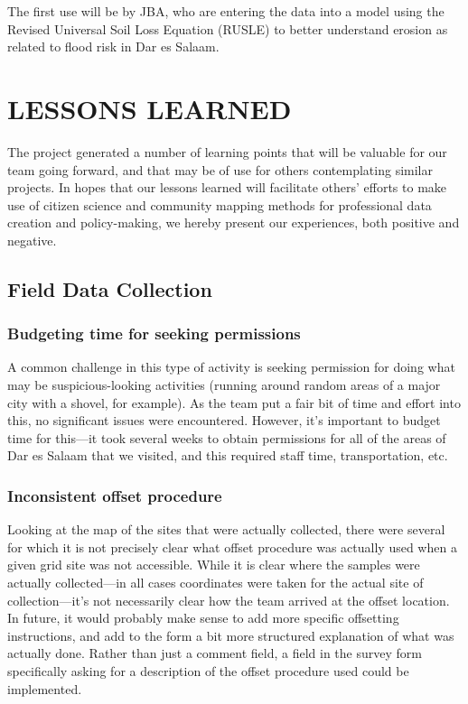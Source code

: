 \documentclass[a4paper,12pt,twoside]{article}
\begin{document}
The first use will be by JBA, who are entering the data into a model using the Revised Universal Soil Loss Equation (RUSLE) to better understand erosion as related to flood risk in Dar es Salaam.

\color{RHblue}
\hypertarget{lessonslearned}{}
\section{LESSONS LEARNED}
\label{lessonslearned}
\color{RHgrey}
The project generated a number of learning points that will be valuable for our team going forward, and that may be of use for others contemplating similar projects. In hopes that our lessons learned will facilitate others' efforts to make use of citizen science and community mapping methods for professional data creation and policy-making, we hereby present our experiences, both positive and negative.

\color{RHblue}
\subsection{Field Data Collection}
\label{fielddatacollection}

\subsubsection{Budgeting time for seeking permissions}

\color{RHgrey}
A common challenge in this type of activity is seeking permission for doing what may be suspicious-looking activities (running around random areas of a major city with a shovel, for example). As the team put a fair bit of time and effort into this, no significant issues were encountered. However, it's important to budget time for this---it took several weeks to obtain permissions for all of the areas of Dar es Salaam that we visited, and this required staff time, transportation, etc.

\color{RHblue}
\subsubsection{Inconsistent offset procedure}
\color{RHgrey}
Looking at the map of the sites that were actually collected, there were several for which it is not precisely clear what offset procedure was actually used when a given grid site was not accessible. While it is clear where the samples were actually collected---in all cases coordinates were taken for the actual site of collection---it's not necessarily clear how the team arrived at the offset location. In future, it would probably make sense to add more specific offsetting instructions, and add to the form a bit more structured explanation of what was actually done. Rather than just a comment field, a field in the survey form specifically asking for a description of the offset procedure used could be implemented.
\end{document}
